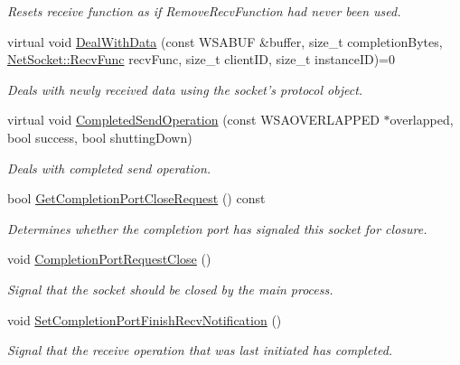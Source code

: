 \begin{DoxyCompactItemize}
\begin{DoxyCompactList}\small\item\em Resets receive function as if RemoveRecvFunction had never been used. \item\end{DoxyCompactList}\item 
virtual void \hyperlink{class_net_socket_a99a69ab706122acc2bbe63c64b279b8e}{DealWithData} (const WSABUF \&buffer, size\_\-t completionBytes, \hyperlink{class_net_socket_a52b5f4de8d0a47fd8620f542b21c076c}{NetSocket::RecvFunc} recvFunc, size\_\-t clientID, size\_\-t instanceID)=0
\begin{DoxyCompactList}\small\item\em Deals with newly received data using the socket's protocol object. \item\end{DoxyCompactList}\item 
virtual void \hyperlink{class_net_socket_a4c8e1cac6b9bde0ef6ce3c137a8563ad}{CompletedSendOperation} (const WSAOVERLAPPED $\ast$overlapped, bool success, bool shuttingDown)
\begin{DoxyCompactList}\small\item\em Deals with completed send operation. \item\end{DoxyCompactList}\item 
bool \hyperlink{class_net_socket_a419d22dbf82c32e89b2664a18f7a05af}{GetCompletionPortCloseRequest} () const 
\begin{DoxyCompactList}\small\item\em Determines whether the completion port has signaled this socket for closure. \item\end{DoxyCompactList}\item 
void \hyperlink{class_net_socket_ad04c291a00cc8b97425a60f6f8a20d3a}{CompletionPortRequestClose} ()
\begin{DoxyCompactList}\small\item\em Signal that the socket should be closed by the main process. \item\end{DoxyCompactList}\item 
void \hyperlink{class_net_socket_a389b4eb60158c997a932798a2de02e68}{SetCompletionPortFinishRecvNotification} ()
\begin{DoxyCompactList}\small\item\em Signal that the receive operation that was last initiated has completed. \item\end{DoxyCompactList}\end{DoxyCompactItemize}
